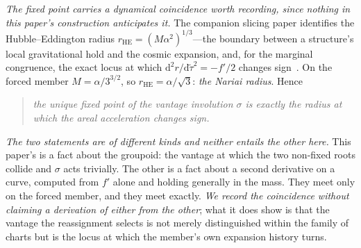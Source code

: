 \documentclass[11pt,a4paper]{article}
\theoremstyle{definition}
\newcommand{\dd}{\mathrm{d}}   %
\begin{document}
\noindent\emph{The fixed point carries a dynamical coincidence worth recording, since nothing in this paper's
construction anticipates it.} The companion slicing paper identifies the Hubble--Eddington radius
$r_{\mathrm{HE}}=(M\alpha^{2})^{1/3}$---the boundary between a structure's local gravitational hold and the
cosmic expansion, and, for the marginal congruence, the exact locus at which
$\dd^{2}r/\dd\tilde\tau^{2}=-f'/2$ changes sign~\cite{JanzenSlicing}. On the forced member
$M=\alpha/3^{3/2}$, so $r_{\mathrm{HE}}=\alpha/\sqrt3$: \emph{the Nariai radius}. Hence
\begin{quote}
\emph{the unique fixed point of the vantage involution $\sigma$ is exactly the radius at which the areal
acceleration changes sign.}
\end{quote}
\emph{The two statements are of different kinds and neither entails the other here.} This paper's is a fact
about the groupoid: the vantage at which the two non-fixed roots collide and $\sigma$ acts trivially. The
other is a fact about a second derivative on a curve, computed from $f'$ alone and holding generally in the
mass. They meet only on the forced member, and they meet exactly. \emph{We record the coincidence without
claiming a derivation of either from the other}; what it does show is that the vantage the reassignment selects
is not merely distinguished within the family of charts but is the locus at which the member's own expansion
history turns.
\end{document}
